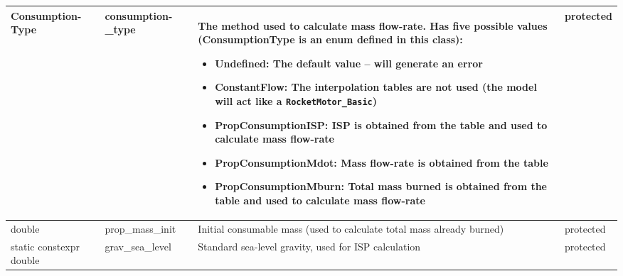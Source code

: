 \documentclass[11pt,fleqn]{report}
\begin{document}
\begin{center}
\begin{longtable}{|p{2.75cm}|p{2.8cm}|p{7.1cm}|l|}
\hline
Consumption-\newline Type & consumption-\newline \_type & The method used to calculate mass flow-rate. Has five possible values (ConsumptionType is an enum defined in this class): 
\begin{itemize}
\item \textbf{Undefined}: The default value -- will generate an error
\item \textbf{ConstantFlow}: The interpolation tables are not used (the model will act like a \verb|RocketMotor_Basic|)
\item \textbf{PropConsumptionISP}: ISP is obtained from the table and used to calculate mass flow-rate
\item \textbf{PropConsumptionMdot}: Mass \newline flow-rate is obtained from the table
\item \textbf{PropConsumptionMburn}: Total mass burned is obtained from the table and used to calculate mass flow-rate
\end{itemize}
& protected \\
\hline
double & prop\_mass\_init & Initial consumable mass (used to calculate total mass already burned) & protected \\
\hline
static constexpr double & grav\_sea\_level & Standard sea-level gravity, used for ISP calculation & protected \\
\hline
\end{longtable}
\end{center}
\end{document}
